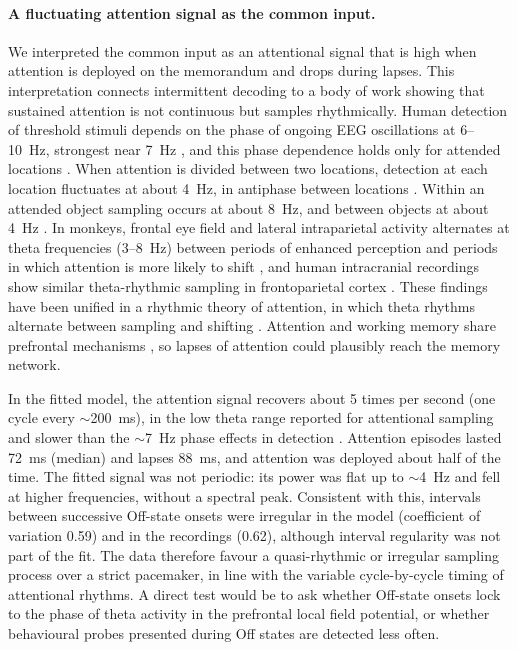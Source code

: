 \paragraph{A fluctuating attention signal as the common input.}
We interpreted the common input as an attentional signal that is high when attention is deployed on the memorandum and drops during lapses.
This interpretation connects intermittent decoding to a body of work showing that sustained attention is not continuous but samples rhythmically.
Human detection of threshold stimuli depends on the phase of ongoing EEG oscillations at 6--10~Hz, strongest near 7~Hz \citep{busch2009}, and this phase dependence holds only for attended locations \citep{busch2010}.
When attention is divided between two locations, detection at each location fluctuates at about 4~Hz, in antiphase between locations \citep{landau2012}.
Within an attended object sampling occurs at about 8~Hz, and between objects at about 4~Hz \citep{fiebelkorn2013}.
In monkeys, frontal eye field and lateral intraparietal activity alternates at theta frequencies (3--8~Hz) between periods of enhanced perception and periods in which attention is more likely to shift \citep{fiebelkorn2018}, and human intracranial recordings show similar theta-rhythmic sampling in frontoparietal cortex \citep{helfrich2018}.
These findings have been unified in a rhythmic theory of attention, in which theta rhythms alternate between sampling and shifting \citep{fiebelkorn2019}.
Attention and working memory share prefrontal mechanisms \citep{awh2001,panichello2021}, so lapses of attention could plausibly reach the memory network.

In the fitted model, the attention signal recovers about 5 times per second (one cycle every $\sim$200~ms), in the low theta range reported for attentional sampling \citep{landau2012,fiebelkorn2018,helfrich2018} and slower than the $\sim$7~Hz phase effects in detection \citep{busch2009,busch2010}.
Attention episodes lasted 72~ms (median) and lapses 88~ms, and attention was deployed about half of the time.
The fitted signal was not periodic: its power was flat up to $\sim$4~Hz and fell at higher frequencies, without a spectral peak.
Consistent with this, intervals between successive Off-state onsets were irregular in the model (coefficient of variation 0.59) and in the recordings (0.62), although interval regularity was not part of the fit.
The data therefore favour a quasi-rhythmic or irregular sampling process over a strict pacemaker, in line with the variable cycle-by-cycle timing of attentional rhythms.
A direct test would be to ask whether Off-state onsets lock to the phase of theta activity in the prefrontal local field potential, or whether behavioural probes presented during Off states are detected less often.

